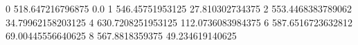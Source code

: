 0 518.647216796875 0.0
1 546.45751953125 27.810302734375
2 553.4468383789062 34.79962158203125
4 630.7208251953125 112.0736083984375
6 587.6516723632812 69.00445556640625
8 567.8818359375 49.234619140625
